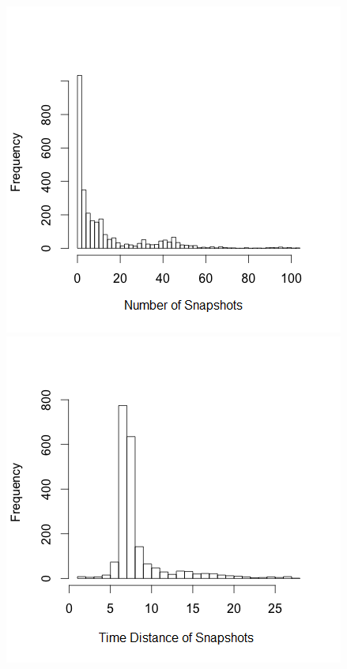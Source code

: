 \begin{figure}[htb]
\centering
\begin{minipage}{.45\linewidth}
\centering
\includegraphics[width=\linewidth]{figs/Rplot__cval.png}
\end{minipage}
\begin{minipage}{.45\linewidth}
\centering
\includegraphics[width=\linewidth]{figs/Rplot__zval.png}

\end{minipage}
\end{figure}
